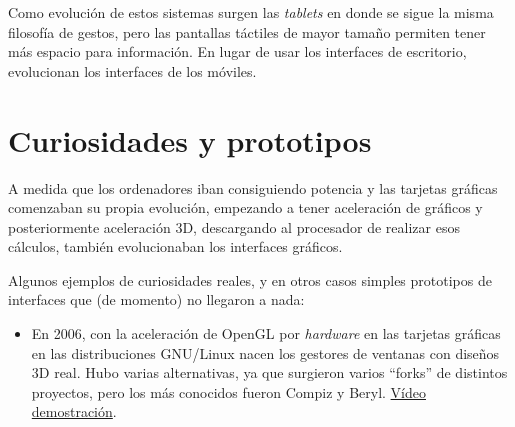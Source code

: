 Como evolución de estos sistemas surgen las \textit{tablets} en donde se sigue la misma filosofía de gestos, pero las pantallas táctiles de mayor tamaño permiten tener más espacio para información. En lugar de usar los interfaces de escritorio, evolucionan los interfaces de los móviles.

\chapter{Curiosidades y prototipos}

A medida que los ordenadores iban consiguiendo potencia y las tarjetas gráficas comenzaban su propia evolución, empezando a tener aceleración de gráficos y posteriormente aceleración 3D,  descargando al procesador de realizar esos cálculos, también evolucionaban los interfaces gráficos.

Algunos ejemplos de curiosidades reales, y en otros casos simples prototipos de interfaces que (de momento) no llegaron a nada:

\begin{itemize}
    \item En 2006, con la aceleración de OpenGL por \textit{hardware} en las tarjetas gráficas en las distribuciones GNU/Linux nacen los gestores de ventanas con diseños 3D real. Hubo varias alternativas, ya que surgieron varios “forks” de distintos proyectos, pero los más conocidos fueron Compiz y Beryl. \href{https://www.youtube.com/watch?v=4QokOwvPxrE}{Vídeo demostración}.
\end{itemize}